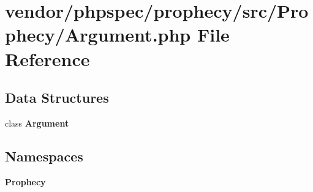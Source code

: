\section{vendor/phpspec/prophecy/src/\+Prophecy/\+Argument.php File Reference}
\label{_argument_8php}
\subsection*{Data Structures}
\begin{DoxyCompactItemize}
\item 
class {\bf Argument}
\end{DoxyCompactItemize}
\subsection*{Namespaces}
\begin{DoxyCompactItemize}
\item 
 {\bf Prophecy}
\end{DoxyCompactItemize}
